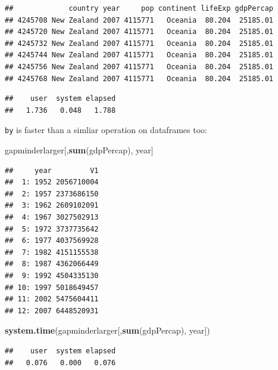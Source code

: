\documentclass[]{article}
\newenvironment{Shaded}{\begin{snugshade}}{\end{snugshade}}
\newcommand{\KeywordTok}[1]{\textcolor[rgb]{0.13,0.29,0.53}{\textbf{{#1}}}}
\newcommand{\StringTok}[1]{\textcolor[rgb]{0.31,0.60,0.02}{{#1}}}
\newcommand{\NormalTok}[1]{{#1}}
\begin{document}
\begin{verbatim}
##             country year     pop continent lifeExp gdpPercap
## 4245708 New Zealand 2007 4115771   Oceania  80.204  25185.01
## 4245720 New Zealand 2007 4115771   Oceania  80.204  25185.01
## 4245732 New Zealand 2007 4115771   Oceania  80.204  25185.01
## 4245744 New Zealand 2007 4115771   Oceania  80.204  25185.01
## 4245756 New Zealand 2007 4115771   Oceania  80.204  25185.01
## 4245768 New Zealand 2007 4115771   Oceania  80.204  25185.01
\end{verbatim}

\begin{Shaded}
\end{Shaded}

\begin{verbatim}
##    user  system elapsed 
##   1.736   0.048   1.788
\end{verbatim}

\texttt{by} is faster than a simliar operation on dataframes too:

\begin{Shaded}
\begin{Highlighting}[]
\NormalTok{gapminderlarger[,}\KeywordTok{sum}\NormalTok{(gdpPercap), year]}
\end{Highlighting}
\end{Shaded}

\begin{verbatim}
##     year         V1
##  1: 1952 2056710004
##  2: 1957 2373686150
##  3: 1962 2609102091
##  4: 1967 3027502913
##  5: 1972 3737735642
##  6: 1977 4037569928
##  7: 1982 4151155538
##  8: 1987 4362066449
##  9: 1992 4504335130
## 10: 1997 5018649457
## 11: 2002 5475604411
## 12: 2007 6448520931
\end{verbatim}

\begin{Shaded}
\begin{Highlighting}[]
\KeywordTok{system.time}\NormalTok{(gapminderlarger[,}\KeywordTok{sum}\NormalTok{(gdpPercap), year])}
\end{Highlighting}
\end{Shaded}

\begin{verbatim}
##    user  system elapsed 
##   0.076   0.000   0.076
\end{verbatim}
\end{document}
